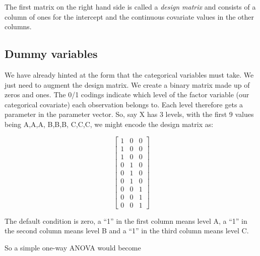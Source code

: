 \documentclass[
  oneside]{krantz}
\begin{document}
The first matrix on the right hand side is called a \emph{design matrix} and consists of a column of ones for the intercept and the continuous covariate values in the other columns.

\hypertarget{dummy-variables}{%
\subsection{Dummy variables}\label{dummy-variables}}

We have already hinted at the form that the categorical variables must take.
We just need to augment the design matrix.
We create a binary matrix made up of zeros and ones. The 0/1 codings indicate which level of the factor variable (our categorical covariate) each observation belongs to. Each level therefore gets a parameter in the parameter vector.
So, say X has 3 levels, with the first 9 values being A,A,A, B,B,B, C,C,C, we might encode the design matrix as:

\[
\left[\begin{array}
{ccc}
1 & 0 & 0\\
 1 & 0 &  0\\  
1 & 0 & 0\\ 
0 & 1 &  0\\
 0 & 1 &  0\\  
0 & 1 & 0\\
0 & 0 &  1\\
 0 & 0 &  1\\  
0 & 0 & 1
\end{array}\right]
\]

The default condition is zero, a ``1'' in the first column means level A, a ``1'' in the second column means level B and a ``1'' in the third column means level C.

So a simple one-way ANOVA would become
\end{document}
